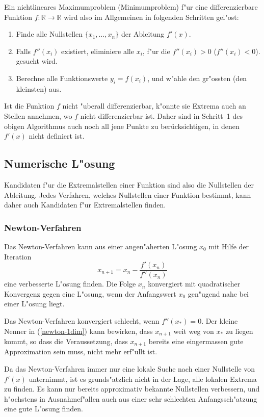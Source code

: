 Ein nichtlineares Maximumproblem (Minimumproblem) f"ur eine differenzierbare
Funktion $f\colon\mathbb R\to\mathbb R$ wird also im Allgemeinen in
folgenden Schritten gel"ost:
\begin{enumerate}
\item Finde alle Nullstellen $\{x_1,\dots,x_n\}$ der Ableitung $f'(x)$.
\item Falls $f''(x_i)$ existiert, eliminiere alle $x_i$, f"ur die
$f''(x_i) > 0$ ($f''(x_i) < 0$).
gesucht wird.
\item Berechne alle Funktionswerte $y_i=f(x_i)$, und w"ahle den
gr"ossten (den kleinsten) aus.
\end{enumerate}

Ist die Funktion $f$ nicht "uberall differenzierbar, k"onnte sie Extrema
auch an Stellen annehmen, wo $f$ nicht differenzierbar ist. Daher
sind in Schritt~1 des obigen Algorithmus auch noch all jene Punkte
zu berücksichtigen, in denen $f'(x)$ nicht definiert ist.

\subsection{Numerische L"osung}
Kandidaten f"ur die Extremalstellen einer Funktion sind also die
Nullstellen der Ableitung. Jedes Verfahren, welches Nullstellen
einer Funktion bestimmt, kann daher auch Kandidaten f"ur Extremalstellen
finden.

\subsubsection{Newton-Verfahren}
Das Newton-Verfahren kann aus einer angen"aherten L"osung $x_0$
mit Hilfe der Iteration
\begin{equation}
x_{n+1}=x_n-\frac{f'(x_n)}{f''(x_n)}
\label{newton-1dim}
\end{equation}
eine verbesserte L"osung finden. Die Folge $x_n$ konvergiert mit
quadratischer Konvergenz gegen eine L"osung, wenn der Anfangswert
$x_0$ gen"ugend nahe bei einer L"osung liegt.

Das Newton-Verfahren konvergiert schlecht, wenn $f''(x_*)=0$.
Der kleine Nenner in (\ref{newton-1dim}) kann bewirken, dass
$x_{n+1}$ weit weg von $x_*$ zu liegen kommt, so dass die
Veraussetzung, dass $x_{n+1}$ bereits eine eingermassen gute 
Approximation sein muss, nicht mehr erf"ullt ist.

Da das Newton-Verfahren immer nur eine lokale Suche nach einer
Nullstelle von $f'(x)$ unternimmt, ist es grunds"atzlich nicht
in der Lage, alle lokalen Extrema zu finden.
Es kann nur bereits approximativ bekannte Nullstellen verbessern,
und h"ochstens in Ausnahmef"allen auch aus einer sehr schlechten Anfangssch"atzung eine gute L"osung finden.

